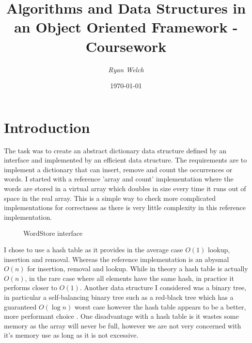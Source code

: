 \documentclass[12pt]{article}
\title{Algorithms and Data Structures in an Object Oriented Framework - Coursework}
\author{\textit{Ryan Welch}}
\date{\today}
\begin{document}
\maketitle
\thispagestyle{fancy}

\tableofcontents

\clearpage

\section{Introduction}
The task was to create an abstract dictionary data structure defined by an interface and implemented by an efficient data structure. The requirements are to implement a dictionary that can insert, remove and count the occurrences or words. I started with a reference 'array and count' implementation where the words are stored in a virtual array which doubles in size every time it runs out of space in the real array. This is a simple way to check more complicated implementations for correctness as there is very little complexity in this reference implementation.

\begin{figure}[!htp]
\centering
{}
\caption{WordStore interface}
\label{lst:wordstore_interface}
\end{figure}

I chose to use a hash table as it provides in the average case $O(1)$ lookup, insertion and removal. Whereas the reference implementation is an abysmal $O(n)$ for insertion, removal and lookup. While in theory a hash table is actually $O(n)$, in the rare case where all elements have the same hash, in practice it performs closer to $O(1)$. Another data structure I considered was a binary tree, in particular a self-balancing binary tree such as a red-black tree which has a guaranteed $O(\log{}n)$ worst case however the hash table appears to be a better, more performant choice \cite{introtoalgorithms}. One disadvantage with a hash table is it wastes some memory as the array will never be full, however we are not very concerned with it's memory use as long as it is not excessive.
\end{document}
